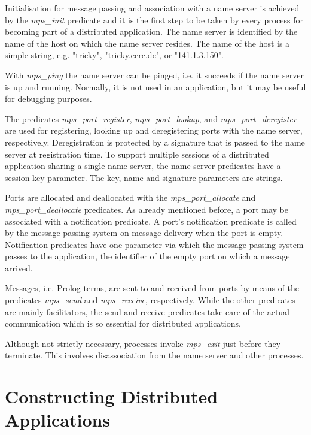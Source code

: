Initialisation for message passing and association with a name server
is achieved by the {\it mps\_init} predicate and it is the first step 
to be taken by every process for becoming part of a distributed \eclipse 
application. The name server is identified by the name of the host on 
which the name server resides. The name of the host is a simple string, 
e.g. "tricky", "tricky.ecrc.de", or "141.1.3.150".

With {\it mps\_ping} the name server can be pinged, i.e. it succeeds if 
the name server is up and running. Normally, it is not used in an 
application, but it may be useful for debugging purposes.

The predicates {\it mps\_port\_register}, {\it mps\_port\_lookup}, and 
{\it mps\_port\_deregister} are used for registering, looking up and
deregistering ports with the name server, respectively. Deregistration
is protected by a signature that is passed to the name server at
registration time. To support multiple sessions of a distributed
application sharing a single name server, the name server predicates
have a session key parameter. The key, name and signature parameters are 
strings. 

Ports are allocated and deallocated with the {\it mps\_port\_allocate} and
{\it mps\_port\_deallocate} predicates. As already mentioned before, a port
may be associated with a notification predicate. A port's notification
predicate is called by the message passing system on message delivery
when the port is empty. Notification predicates have one parameter via
which the message passing system passes to the application, the identifier 
of the empty port on which a message arrived.

Messages, i.e. Prolog terms, are sent to and received from ports
by means of the predicates {\it mps\_send} and {\it mps\_receive}, 
respectively. While the other predicates are mainly facilitators, the 
send and receive predicates take care of the actual communication which is
so essential for distributed applications.

Although not strictly necessary, processes invoke {\it mps\_exit} just 
before they terminate. This involves disassociation from the name server 
and other processes.



\section{Constructing Distributed Applications}
\label{sec:examples}

